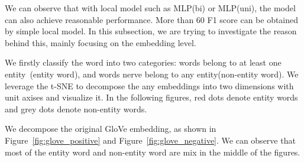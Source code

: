 \documentclass{article}
\begin{document}
We can observe that with local model such as MLP(bi) or MLP(uni), the model can also achieve reasonable performance. More than 60 F1 score can be obtained by simple local model. In this subsection, we are trying to investigate the reason behind this, mainly focusing on the embedding level. 

We firstly classify the word into two categories: words belong to at least one entity~(entity word), and words nerve belong to any entity(non-entity word). We leverage the t-SNE to decompose the any embeddings into two dimensions with unit axises and visualize it. In the following figures, red dots denote entity words and grey dots denote non-entity words. 

We decompose the original GloVe embedding, as shown in Figure~\ref{fig:glove_positive} and Figure~\ref{fig:glove_negative}. We can observe that most of the entity word and non-entity word are mix in the middle of the figures. 
\end{document}
